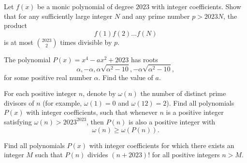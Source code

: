 \documentclass[11pt]{article}
\theoremstyle{definition}
\begin{document}
%	




\begin{question}[name={2023 German TST 4, \href{https://artofproblemsolving.com/community/c6h3111820p28148783}{Problem 3}}]
	Let $f(x)$ be a monic polynomial of degree $2023$ with integer coefficients.
	Show that for any sufficiently large integer $N$ and any prime number $p>2023N$, the product
	\[f(1)f(2)\dots f(N)\]is at most $\binom{2023}{2}$ times divisible by $p$.
\end{question}


%	



\begin{question}[name={2023 Purple Comet, \href{https://artofproblemsolving.com/community/c6h3082466p27849705}{Problem 16}}]
	The polynomial $P(x)=x^4-ax^2+2023$ has roots $$\alpha  ,-\alpha  ,\alpha\sqrt{\alpha^2-10}  ,-\alpha\sqrt{\alpha^2-10},$$ for some positive real number $\alpha$. Find the value of $a$.
\end{question}


%	


\begin{question}[name={2023 British Math Olympiad, \href{https://artofproblemsolving.com/community/c6h3069481p27703501}{Problem 3}}]
	For each positive integer $n$, denote by $\omega(n)$ the number of distinct prime divisors of $n$ (for example, $\omega(1)=0$ and $\omega(12)=2$). Find all polynomials $P(x)$ with integer coefficients, such that whenever $n$ is a positive integer satisfying $\omega(n)>2023^{2023}$, then $P(n)$ is also a positive integer with
	\[\omega(n)\ge\omega(P(n)).\]
\end{question}



%	



\begin{question}[name={2023 Thailand Mock IMO, \href{https://artofproblemsolving.com/community/c6h3082444p27849614}{Problem 4}}]
	Find all polynomials $P(x)$ with integer coefficients for which there exists an integer $M$ such that $P(n)$ divides $(n+2023)!$ for all positive integers $n>M$.
\end{question}
\end{document}
